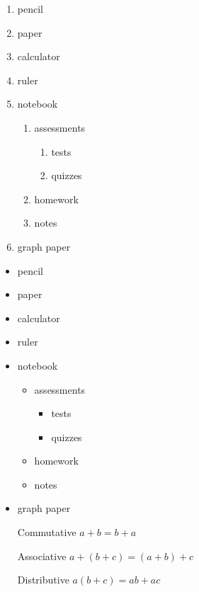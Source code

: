 \documentclass[11 pt]{article}
\begin{document}
\begin{enumerate}
\item pencil
\item paper
\item calculator
\item ruler
\item notebook
       \begin{enumerate}
       \item assessments
          \begin{enumerate}
          \item tests
          \item quizzes
          \end{enumerate}
       \item homework
       \item notes
       \end{enumerate}
\item graph paper
\end{enumerate}

\begin{itemize}
\item pencil
\item paper
\item calculator
\item ruler
\item notebook
       \begin{itemize}
       \item assessments
          \begin{itemize}
          \item tests
          \item quizzes
          \end{itemize}
       \item homework
       \item notes
       \end{itemize}
\item graph paper
\end{itemize}

\begin{enumerate}
\item[Commutative] $a+b=b+a$
\item[Associative] $a+(b+c)=(a+b)+c$
\item[Distributive] $a(b+c)=ab+ac$
\end{enumerate}
\end{document}
